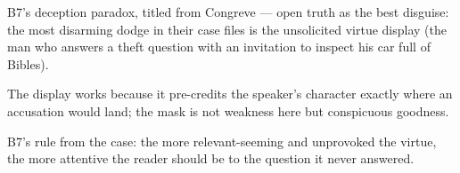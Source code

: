 

\begin{distilled}
  \item B7's deception paradox, titled from Congreve --- open truth as the best disguise: the most disarming dodge in their case files is the unsolicited virtue display (the man who answers a theft question with an invitation to inspect his car full of Bibles).
  \item The display works because it pre-credits the speaker's character exactly where an accusation would land; the mask is not weakness here but conspicuous goodness.
  \item B7's rule from the case: the more relevant-seeming and unprovoked the virtue, the more attentive the reader should be to the question it never answered.
\end{distilled}
